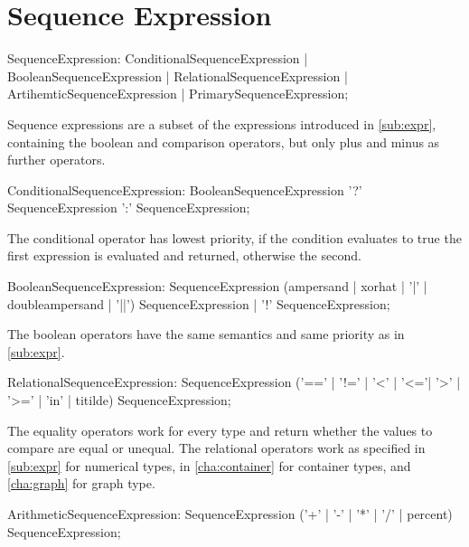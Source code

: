 \section{Sequence Expression} \label{sec:seqexpr}

\begin{rail}
  SequenceExpression:  
    ConditionalSequenceExpression |
    BooleanSequenceExpression |
    RelationalSequenceExpression |
    ArtihemticSequenceExpression |
    PrimarySequenceExpression;
\end{rail}

Sequence expressions are a subset of the expressions introduced in \ref{sub:expr}, containing the boolean and comparison operators, but only plus and minus as further operators.

\begin{rail}
  ConditionalSequenceExpression: 
    BooleanSequenceExpression '?' SequenceExpression ':' SequenceExpression;
\end{rail}

The conditional operator has lowest priority, if the condition evaluates to true the first expression is evaluated and returned, otherwise the second.

\begin{rail}
  BooleanSequenceExpression: 
    SequenceExpression (ampersand | xorhat | '|' | doubleampersand | '||') SequenceExpression |
    '!' SequenceExpression;
\end{rail}

The boolean operators have the same semantics and same priority as in \ref{sub:expr}.

\begin{rail}
  RelationalSequenceExpression: 
    SequenceExpression ('==' | '!=' | '<' | '<='| '>' | '>=' | 'in' | titilde) SequenceExpression;
\end{rail}

The equality operators work for every type and return whether the values to compare are equal or unequal.
The relational operators work as specified in \ref{sub:expr} for numerical types, in \ref{cha:container} for container types, and \ref{cha:graph} for graph type.

\begin{rail}
  ArithmeticSequenceExpression:
    SequenceExpression ('+' | '-' | '*' | '/' | percent) SequenceExpression;
\end{rail}

